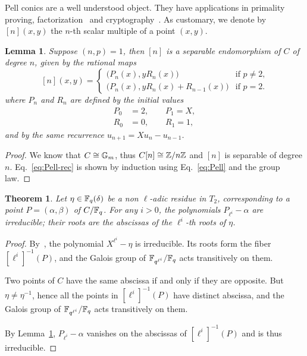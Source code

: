 \documentclass{sig-alternate}
\newtheorem{theorem}[definition]{Theorem}
\newtheorem{lemma}[definition]{Lemma}
\begin{document}
Pell conics are a well understood object. They have applications in
primality proving, factorization~\cite{lemmermeyer03,hambleton12} and
cryptography~\cite{rubin-silverberg+crypto03}. As customary, we denote
by $[n](x,y)$ the $n$-th scalar multiple of a point
$(x,y)$.

\begin{lemma}
  \label{th:T2-divpol}
  Suppose $(n,p)=1$, then $[n]$ is a separable endomorphism of $C$ of
  degree $n$, given by the rational maps
  \begin{equation}
    \label{eq:Pell-rec}
    [n](x,y) = 
    \begin{cases}
      \bigr(P_n(x), y R_n(x)\bigl) & \text{if $p\ne2$,}\\
      \bigr(P_n(x), y R_n(x) + R_{n-1}(x)\bigl) & \text{if $p=2$.}      
    \end{cases}
  \end{equation}
  where $P_n$ and $R_n$ are defined by the initial values
  \begin{align*}
    P_0 &= 2,\qquad P_1=X,\\
    R_0 &= 0,\qquad R_1=1,
  \end{align*}
  and by the same recurrence $u_{n+1} = Xu_{n} - u_{n-1}$.
\end{lemma}
\begin{proof}
  We know that $C\cong\mathbb{G}_m$, thus $C[n]\cong\mathbb{Z}/n\mathbb{Z}$ and $[n]$
  is separable of degree $n$. Eq.~\eqref{eq:Pell-rec} is shown by
  induction using Eq.~\eqref{eq:Pell} and the group law.
\end{proof}





\begin{theorem}
  \label{th:T2-irred}
  Let $\eta\in\mathbb{F}_q(\delta)$ be a non $\ell$-adic residue in $T_2$,
  corresponding to a point $P=(\alpha,\beta)$ of $C/\mathbb{F}_q$. For any
  $i>0$, the polynomials $P_{\ell^i}-\alpha$ are irreducible; their
  roots are the abscissas of the $\ell^i$-th roots of $\eta$.
\end{theorem}
\begin{proof}
  By~\cite[Th.~VI.9.1]{lang}, the polynomial $X^{\ell^i}-\eta$ is
  irreducible. Its roots form the fiber $[\ell^i]^{-1}(P)$, and the
  Galois group of $\mathbb{F}_{q^{\ell^i}}/\mathbb{F}_q$ acts transitively on them.

  Two points of $C$ have the same abscissa if and only if they are
  opposite. But $\eta\ne\eta^{-1}$, hence all the points in
  $[\ell^i]^{-1}(P)$ have distinct abscissa, and the Galois group of
  $\mathbb{F}_{q^{\ell^i}}/\mathbb{F}_q$ acts transitively on them.  

  By Lemma~\ref{th:T2-divpol}, $P_{\ell^i}-\alpha$ vanishes on the
  abscissas of $[\ell^i]^{-1}(P)$ and is thus irreducible.
\end{proof}
\end{document}
